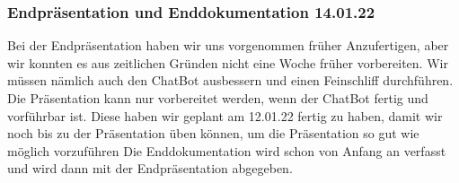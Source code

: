 \subsubsection{Endpräsentation und Enddokumentation \color{green} 14.01.22}
Bei der Endpräsentation haben wir uns vorgenommen früher Anzufertigen, aber wir konnten es aus zeitlichen Gründen nicht eine Woche früher vorbereiten.
Wir müssen nämlich auch den ChatBot ausbessern und einen Feinschliff durchführen. Die Präsentation kann nur vorbereitet werden, wenn der ChatBot fertig und vorführbar ist. 
Diese haben wir geplant am 12.01.22 fertig zu haben, damit wir noch bis zu der Präsentation üben können,
um die Präsentation so gut wie möglich vorzuführen
Die Enddokumentation wird schon von Anfang an verfasst und wird dann mit der Endpräsentation abgegeben.
